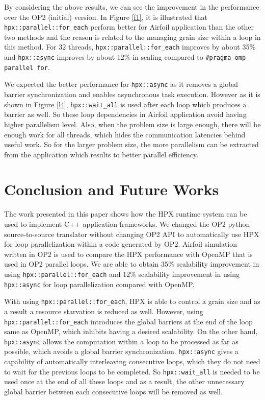 \documentclass[conference]{IEEEtran}
\begin{document}
By considering the above results, we can see the improvement in the performance over the OP2 (initial) version. In Figure \ref{f1}, it is illustrated that \texttt{hpx::parallel::for\_each} perform better for Airfoil application than the other two methods and the reason is related to the managing grain size within a loop in this method. For $32$ threads, \texttt{hpx::parallel::for\_each} improves by about 35\% and \texttt{hpx::async} improves by about 12\% in scaling compared to \texttt{\#pragma omp parallel for}. 

We expected the better performance for \texttt{hpx::async} as it removes a global barrier synchronization and enables asynchronous task execution. However as it is shown in Figure \ref{l4}, \texttt{hpx::wait\_all} is used after each loop which produces a barrier as well.  So these loop dependencies in Airfoil application avoid having higher parallelism level. Also, when the problem size is large enough, there will be enough work for all threads, which hides the communication latencies behind useful work. So for the larger problem size, the more parallelism can be extracted from the application which results to better parallel efficiency. 




\section{Conclusion and Future Works}
\label{sec:future}

The work presented in this paper shows how the HPX runtime system can be used to implement C++ application frameworks. We changed the OP2 python source-to-source translator without changing OP2 API to automatically use HPX for loop parallelization within a code generated by OP2. Airfoil simulation written in OP2 is used to compare the HPX performance with OpenMP that is used in OP2 parallel loops. We are able to obtain 35\% scalability improvement in using \texttt{hpx::parallel::for\_each} and 12\% scalability improvement in using \texttt{hpx::async} for loop parallelization compared with OpenMP.

With using \texttt{hpx::parallel::for\_each}, HPX is able to control a grain size and as a result a resource starvation is reduced as well. However, using \texttt{hpx::parallel::for\_each} introduces the global barriers at the end of the loop same as OpenMP, which inhibits having a desired scalability. On the other hand, \texttt{hpx::async} allows the computation within a loop to be processed as far as possible, which avoids a global barrier synchronization. \texttt{hpx::async} gives a capability of automatically interleaving consecutive loops, which they do not need to wait for the previous loops to be completed. So \texttt{hpx::wait\_all} is needed to be used once at the end of all these loops and as a result, the other unnecessary global barrier between each consecutive loops will be removed as well. 
\end{document}
